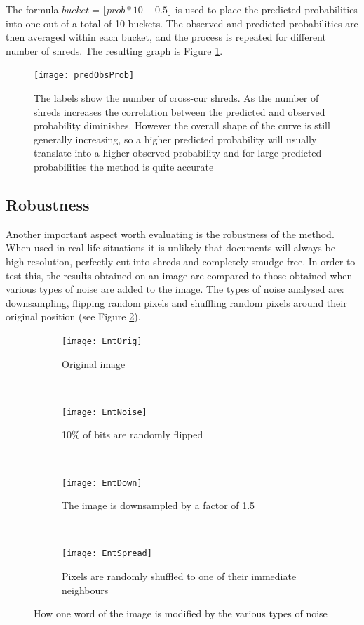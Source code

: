 The formula $bucket = \lfloor prob * 10 + 0.5\rfloor$ is used to place the predicted probabilities into one out of a total of 10 buckets. The observed and predicted probabilities are then averaged within each bucket, and the process is repeated for different number of shreds. The resulting graph is Figure \ref{fig:probComp}.
\begin{figure}[h]
\centering
\texttt{[image: predObsProb]}
\caption{The labels show the number of cross-cur shreds. As the number of shreds increases the correlation between the predicted and observed probability diminishes. However the overall shape of the curve is still generally increasing, so a higher predicted probability will usually translate into a higher observed probability and for large predicted probabilities the method is quite accurate}
\label{fig:probComp}
\end{figure}

\subsection{Robustness}
Another important aspect worth evaluating is the robustness of the method. When used in real life situations it is unlikely that documents will always be high-resolution, perfectly cut into shreds and completely smudge-free. In order to test this, the results obtained on an image are compared to those obtained when various types of noise are added to the image. The types of noise analysed are: downsampling, flipping random pixels and shuffling random pixels around their original position (see Figure \ref{fig:noiseTypes}). 

\begin{figure}[h]
        \centering
        \begin{subfigure}[b]{0.4\textwidth}
                \centering
                \texttt{[image: EntOrig]}
                \caption{Original image}
        \end{subfigure}
        ~ 
        \begin{subfigure}[b]{0.4\textwidth}
                \centering
                \texttt{[image: EntNoise]}
                \caption{10\% of bits are randomly flipped}
        \end{subfigure}
        ~ 
        \begin{subfigure}[b]{0.4\textwidth}
                \centering
                \texttt{[image: EntDown]}
                \caption{The image is downsampled by a factor of 1.5}
        \end{subfigure}
        ~ 
        \begin{subfigure}[b]{0.4\textwidth}
                \centering
                \texttt{[image: EntSpread]}
                \caption{Pixels are randomly shuffled to one of their immediate neighbours}
        \end{subfigure}
        \caption{How one word of the image is modified by the various types of noise}
        \label{fig:noiseTypes}
\end{figure}

